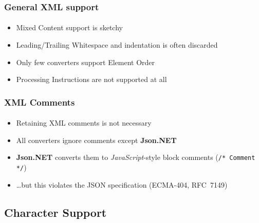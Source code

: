 \documentclass[
    alternativetitlepage=alternativ,
    cornerlogo=hgi_nds_logo2,
    sectionoverview,
]{rubpresentation}
\begin{document}
\begin{frame}
  \frametitle{General XML support}
  \framesubtitle{}
  \begin{itemize}
    \item{} Mixed Content support is sketchy
    \item{} Leading/Trailing Whitespace and indentation is often discarded
    \item{} Only few converters support Element Order
    \item{} Processing Instructions are not supported at all
  \end{itemize}
\end{frame}

\begin{frame}
  \frametitle{XML Comments}
  \framesubtitle{}
  \begin{itemize}
    \item{} Retaining XML comments is not necessary
    \item{} All converters ignore comments except \textbf{Json.NET}
    \item{} \textbf{Json.NET} converts them to \emph{JavaScript}-style block comments (\texttt{/* Comment */})
    \item{} \dots{}but this violates the JSON specification (ECMA-404, RFC~7149)
  \end{itemize}
\end{frame}

\subsection{Character Support}

\begingroup
  \begin{frame}[fragile]
    \vspace{-1.15cm}
    \begin{center}
      
    \end{center}
  \end{frame}
\endgroup

\begingroup
  \begin{frame}[fragile]
    \vspace{-1.15cm}
    \begin{center}
      
    \end{center}
  \end{frame}
\endgroup
\end{document}
